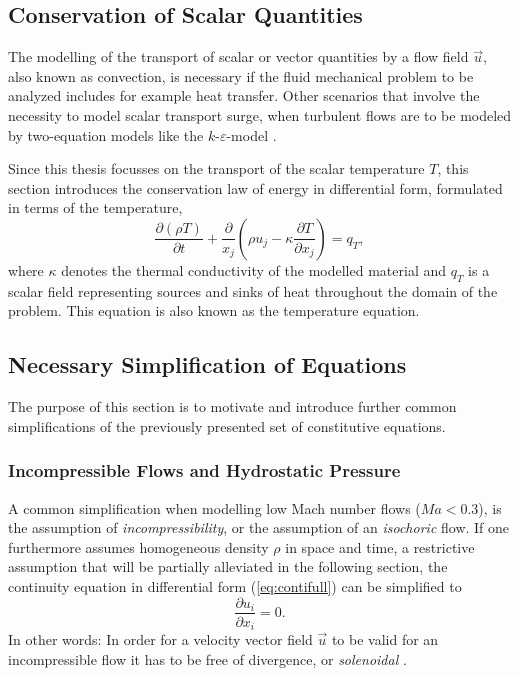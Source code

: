 \subsection{Conservation of Scalar Quantities}

The modelling of the transport of scalar or vector quantities by a flow field \(\vec{u}\), also known as convection, is necessary if the fluid mechanical problem to be analyzed includes for example heat transfer. Other scenarios that involve the necessity to model scalar transport surge, when turbulent flows are to be modeled by two-equation models like the \(k\)-\(\varepsilon\)-model \cite{pope00}. 
    
Since this thesis focusses on the transport of the scalar temperature \(T\), this section introduces the conservation law of energy in differential form, formulated in terms of the temperature,
\begin{equation}
  \frac{\partial \left(\rho T \right)}{\partial t} + \frac{\partial}{x_j} \left( \rho u_j - \kappa \frac{\partial T}{\partial x_j} \right) = q_T,
\end{equation}
where \(\kappa\) denotes the thermal conductivity of the modelled material and \(q_T\) is a scalar field representing sources and sinks of heat throughout the domain of the problem. This equation is also known as the temperature equation.


\subsection{Necessary Simplification of Equations}

The purpose of this section is to motivate and introduce further common simplifications of the previously presented set of constitutive equations. 

\subsubsection{Incompressible Flows and Hydrostatic Pressure}

A common simplification when modelling low Mach number flows (\(Ma < 0.3\)), is the assumption of \emph{incompressibility}, or the assumption of an \emph{isochoric} flow. If one furthermore assumes homogeneous density \(\rho\) in space and time, a restrictive assumption that will be partially alleviated in the following section, the continuity equation in differential form (\ref{eq:contifull}) can be simplified to
\begin{equation}
  \label{eq:contiinc}
  \frac{\partial u_i}{\partial x_i} = 0.
\end{equation}
In other words: In order for a velocity vector field \(\vec{u}\) to be valid for an incompressible flow it has to be free of divergence, or \emph{solenoidal} \cite{spurk10,aris62}.

